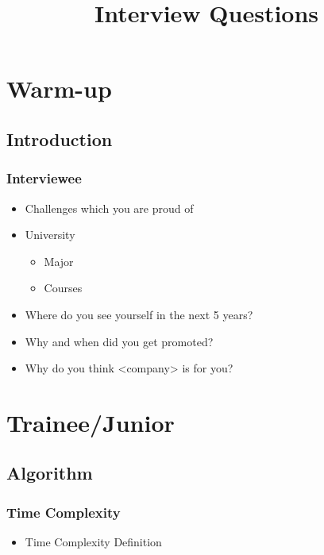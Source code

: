\documentclass[]{book}
\begin{document}
\title{Interview Questions}

\maketitle

\chapter{Warm-up}

\section{Introduction}

\subsection{Interviewee}

\begin{itemize}
  \item Challenges which you are proud of
  \item University
    \begin{itemize}
      \item Major
      \item Courses
    \end{itemize}
  \item Where do you see yourself in the next 5 years?
  \item Why and when did you get promoted?
  \item Why do you think <company> is for you?
\end{itemize}

\chapter{Trainee/Junior}

\section{Algorithm}

\subsection{Time Complexity}

\begin{itemize}
  \item Time Complexity Definition
\end{itemize}
\end{document}
